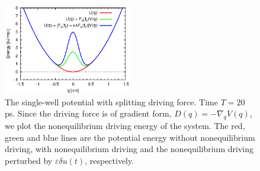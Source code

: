 \documentclass[]{tMPH2e}
\newcommand{\eps}{\varepsilon}
\begin{document}
\begin{figure}
  \centering
  \includegraphics[width=0.5\textwidth]{figs/fig-split-pot.eps}
  \caption{The single-well potential with  splitting driving
    force. Time $T = 20$ ps.  Since the driving force is
    of gradient form, $ D( q) = -\nabla_{q}V( q)$,
    we plot the nonequilibrium driving energy of the system.  The red,
    green and blue lines are the potential energy without
    nonequilibrium driving, with nonequilibrium driving and
    the nonequilibrium driving perturbed by $\eps\delta u(t)$,
    respectively.  }
  \label{fig:tmp4}
\end{figure}
\end{document}
